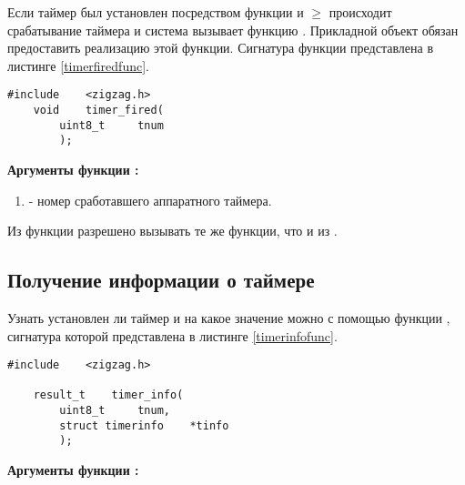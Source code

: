 Если таймер был установлен посредством функции  и $\geq$
происходит срабатывание таймера и система вызывает функцию . Прикладной объект обязан
предоставить реализацию этой функции. Сигнатура функции  представлена в листинге \ref{timerfiredfunc}.

\begin{lstlisting}[caption=Функция \myfunc{timer\_fired()} - срабатывание таймера., label=timerfiredfunc ]
    #include    <zigzag.h>
    void    timer_fired(
        uint8_t     tnum
        );
\end{lstlisting}

{\bfseries Аргументы функции :}

{\itshape
\begin{enumerate}
\item {} - номер сработавшего аппаратного таймера.
\end{enumerate}
}

Из функции  разрешено вызывать те же функции, что и из .

\subsection{Получение информации о таймере}

Узнать установлен ли таймер и на какое значение  можно с помощью функции , сигнатура
которой представлена в листинге \ref{timerinfofunc}.

\begin{lstlisting}[caption=\myfunc{timer\_info()} - информация о таймере, label=timerinfofunc ]
    #include    <zigzag.h>

    result_t    timer_info(
        uint8_t     tnum,
        struct timerinfo    *tinfo
        );
\end{lstlisting}

{\bfseries Аргументы функции :}


